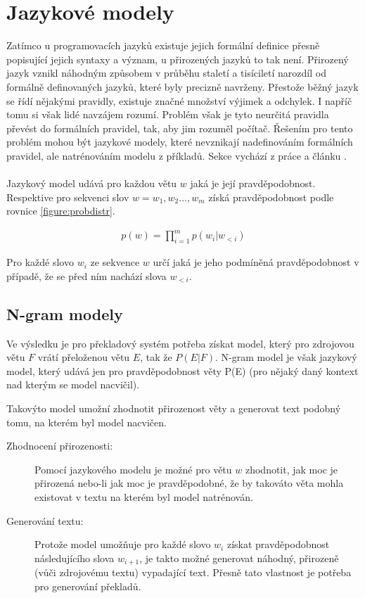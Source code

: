 \section{Jazykové modely}\label{section:langmodel}
Zatímco u programovacích jazyků existuje jejich formální definice přesně popisující jejich syntaxy a význam, u přirozených jazyků to tak není. Přirozený jazyk vznikl náhodným způsobem v průběhu staletí a tisíciletí narozdíl od formálně definovaných jazyků, které byly precizně navrženy. Přestože běžný jazyk se řídí nějakými pravidly, existuje značné množství výjimek a odchylek. I napříč tomu si však lidé navzájem rozumí. Problém však je tyto neurčitá pravidla převést do formálních pravidel, tak, aby jim rozuměl počítač. Řešením pro tento problém mohou být jazykové modely, které nevznikají nadefinováním formálních pravidel, ale natrénováním modelu z příkladů. Sekce vychází z práce \cite{nmtThesis} a článku \cite{nmtTutorial}.
\\\\
Jazykový model udává pro každou větu $w$ jaká je její pravděpodobnost. Respektive pro sekvenci slov $w = w_1, w_2..., w_m$ získá pravděpodobnost podle rovnice \ref{figure:probdistr}.

\begin{align}\label{figure:probdistr}
  p(w) = \prod_{i=1}^{m} p(w_i|w_{<i})
\end{align}

Pro každé slovo $w_i$ ze sekvence $w$ určí jaká je jeho podmíněná pravděpodobnost v případě, že se před ním nachází slova $w_{<i}$.

\subsection{N-gram modely}\label{subsection:ngram}
Ve výsledku je pro překladový systém potřeba získat model, který pro zdrojovou větu $F$ vrátí přeloženou větu $E$, tak že $P(E|F)$. N-gram model je však jazykový model, který udává jen pro pravděpodobnost věty P(E) (pro nějaký daný kontext nad kterým se model nacvičil).

Takovýto model umožní zhodnotit přirozenost věty a generovat text podobný tomu, na kterém byl model nacvičen.

\begin{description}
  \item[Zhodnocení přirozenosti:] Pomocí jazykového modelu je možné pro větu $w$ zhodnotit, jak moc je přirozená nebo-li jak moc je pravděpodobné, že by takováto věta mohla existovat v textu na kterém byl model natrénován.
  \item[Generování textu:] Protože model umožňuje pro každé slovo $w_i$ získat pravděpodobnost následujícího slova $w_{i+1}$, je takto možné generovat náhodný, přirozeně (vůči zdrojovému textu) vypadající text. Přesně tato vlastnost je potřeba pro generování překladů.
\end{description}

